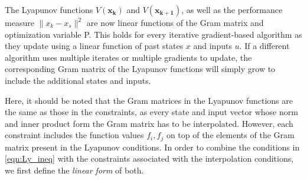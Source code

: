 

The Lyapunov functions $V(\mathbf{x_k})$ and $V(\mathbf{x_{k+1}})$, as well as the performance measure $\|x_k - x_s\|^2$ are now linear functions of the Gram matrix and optimization variable P. This holds for every iterative gradient-based algorithm as they update using a linear function of past states $x$ and inputs $u$. If a different algorithm uses multiple iterates or multiple gradients to update, the corresponding Gram matrix of the Lyapunov functions will simply grow to include the additional states and inputs.

Here, it should be noted that the Gram matrices in the Lyapunov functions are the same as those in the constraints, as every state and input vector whose norm and inner product form the Gram matrix has to be interpolated. However, each constraint includes the function values $f_i, f_j$ on top of the elements of the Gram matrix present in the Lyapunov conditions. In order to combine the conditions in \eqref{eqn:Ly_ineq} with the constraints associated with the interpolation conditions, we first define the \textit{linear form} of both.

